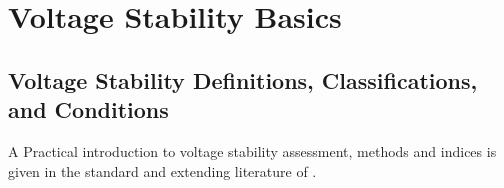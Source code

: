 
\section{Voltage Stability Basics}

\subsection{Voltage Stability Definitions, Classifications, and Conditions}
\label{sec:voltage-stability-definitions}
A Practical introduction to voltage stability assessment, methods and indices is given in the standard and extending literature of \textcite{rueda-torresEvaluationVoltageStability2024,danishVoltageStabilityElectric2015,cutsemVoltageStabilityElectric1998}.

